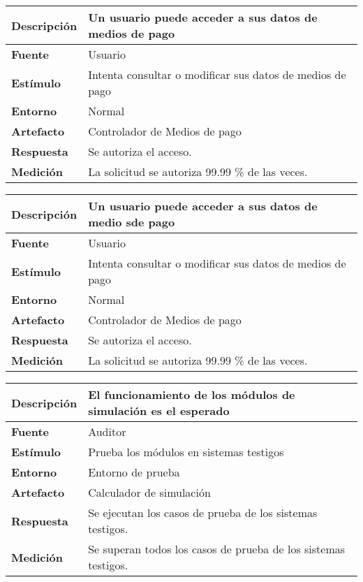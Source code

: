 \begin{center}
  \begin{tabular}{| l | p{10cm} | }
    \hline
	\textbf{Descripción} & Un usuario puede acceder a sus datos de medios de pago\\  \hline
	\textbf{Fuente} & Usuario\\  \hline
	\textbf{Estímulo} & Intenta consultar o modificar sus datos de medios de pago\\  \hline
	\textbf{Entorno} & Normal\\  \hline
	\textbf{Artefacto} & Controlador de Medios de pago\\  \hline
	\textbf{Respuesta} & Se autoriza el acceso.\\  \hline
	\textbf{Medición} & La solicitud se autoriza 99.99 \% de las veces.\\  \hline
  \end{tabular}
\end{center} 

\begin{center}
  \begin{tabular}{| l | p{10cm} | }
    \hline
	\textbf{Descripción} & Un usuario puede acceder a sus datos de medio sde pago\\  \hline
	\textbf{Fuente} & Usuario\\  \hline
	\textbf{Estímulo} & Intenta consultar o modificar sus datos de medios de pago\\  \hline
	\textbf{Entorno} & Normal\\  \hline
	\textbf{Artefacto} & Controlador de Medios de pago\\  \hline
	\textbf{Respuesta} & Se autoriza el acceso.\\  \hline
	\textbf{Medición} & La solicitud se autoriza 99.99 \% de las veces.\\  \hline
  \end{tabular}
\end{center}


\begin{center}
  \begin{tabular}{| l | p{10cm} | }
    \hline
	\textbf{Descripción} & El funcionamiento de los módulos de simulación es el esperado\\  \hline
	\textbf{Fuente} & Auditor\\  \hline
	\textbf{Estímulo} & Prueba los módulos en sistemas testigos\\  \hline
	\textbf{Entorno} & Entorno de prueba\\  \hline
	\textbf{Artefacto} & Calculador de simulación\\  \hline
	\textbf{Respuesta} & Se ejecutan los casos de prueba de los sistemas testigos.\\  \hline
	\textbf{Medición} & Se superan todos los casos de prueba de los sistemas testigos.\\  \hline
  \end{tabular}
\end{center}

